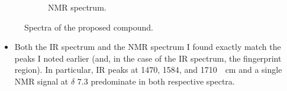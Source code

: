 \documentclass[titlepage]{article}
\begin{document}
\begin{enumerate}
\begin{figure}[h!]
\begin{subfigure}[b]{0.4\linewidth}
            \caption{ NMR spectrum.}
            \label{fig:spectrab}
        \end{subfigure}
        \caption{Spectra of the proposed compound.}
        \label{fig:spectra}
    \end{figure}
    \begin{itemize}
        \item Both the IR spectrum\supercite{bib:Chlorobenzene-IR} and the  NMR spectrum\supercite{bib:Chlorobenzene-1HNMR} I found exactly match the peaks I noted earlier (and, in the case of the IR spectrum, the fingerprint region). In particular, IR peaks at 1470, 1584, and \SI{1710}{\per\centi\meter} and a single  NMR signal at $\delta$ 7.3 predominate in both respective spectra.
    \end{itemize}
\end{enumerate}
\newpage



\printbibliography
\end{document}
